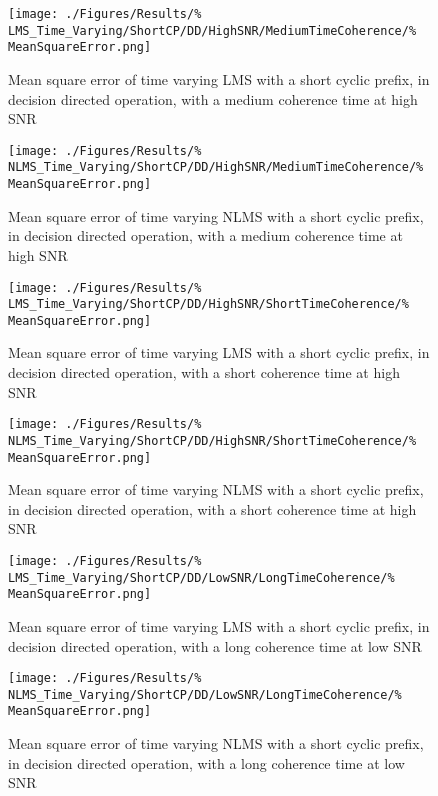\begin{figure}[ht]
	\centering
	\begin{minipage}{0.49\textwidth}
		\centering
		\texttt{[image: ./Figures/Results/\%
	LMS\_Time\_Varying/ShortCP/DD/HighSNR/MediumTimeCoherence/\%
	MeanSquareError.png]}
		\captionsetup{width=0.75\linewidth}
		\caption{Mean square error of time varying LMS with a 
		short cyclic prefix, in decision directed operation, 
		with a medium coherence time at high SNR}
	\end{minipage}
	\begin{minipage}{0.49\textwidth}
		\centering
		\texttt{[image: ./Figures/Results/\%
	NLMS\_Time\_Varying/ShortCP/DD/HighSNR/MediumTimeCoherence/\%
	MeanSquareError.png]}
		\captionsetup{width=0.75\linewidth}
		\caption{Mean square error of time varying NLMS with 
		a short cyclic prefix, in decision directed 
		operation, with a medium coherence time at high SNR}
	\end{minipage}
\end{figure}

\begin{figure}[ht]
	\centering
	\begin{minipage}{0.49\textwidth}
		\centering
		\texttt{[image: ./Figures/Results/\%
	LMS\_Time\_Varying/ShortCP/DD/HighSNR/ShortTimeCoherence/\%
	MeanSquareError.png]}
		\captionsetup{width=0.75\linewidth}
		\caption{Mean square error of time varying LMS with a 
		short cyclic prefix, in decision directed operation, 
		with a short coherence time at high SNR}
	\end{minipage}
	\begin{minipage}{0.49\textwidth}
		\centering
		\texttt{[image: ./Figures/Results/\%
	NLMS\_Time\_Varying/ShortCP/DD/HighSNR/ShortTimeCoherence/\%
	MeanSquareError.png]}
		\captionsetup{width=0.75\linewidth}
		\caption{Mean square error of time varying NLMS with 
		a short cyclic prefix, in decision directed 
		operation, with a short coherence time at high SNR}
		\label{fig:NLMS-Short-High-Directed-Short}
	\end{minipage}
\end{figure}

\begin{figure}[ht]
	\centering
	\begin{minipage}{0.49\textwidth}
		\centering
		\texttt{[image: ./Figures/Results/\%
	LMS\_Time\_Varying/ShortCP/DD/LowSNR/LongTimeCoherence/\%
	MeanSquareError.png]}
		\captionsetup{width=0.75\linewidth}
		\caption{Mean square error of time varying LMS with a 
		short cyclic prefix, in decision directed operation, 
		with a long coherence time at low SNR}
	\end{minipage}
	\begin{minipage}{0.49\textwidth}
		\centering
		\texttt{[image: ./Figures/Results/\%
	NLMS\_Time\_Varying/ShortCP/DD/LowSNR/LongTimeCoherence/\%
	MeanSquareError.png]}
		\captionsetup{width=0.75\linewidth}
		\caption{Mean square error of time varying NLMS with 
		a short cyclic prefix, in decision directed 
		operation, with a long coherence time at low SNR}
	\end{minipage}
\end{figure}

